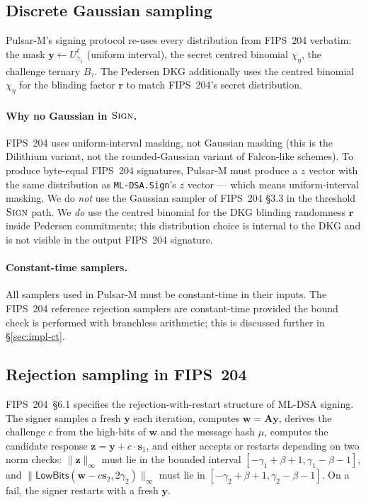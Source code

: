 \documentclass[11pt,a4paper]{article}
\theoremstyle{definition}
\theoremstyle{remark}
\newcommand{\LowBits}{\mathsf{LowBits}}
\newcommand{\Sign}{\textsc{Sign}}
\begin{document}
\subsection{Discrete Gaussian sampling}
\label{sec:prelim-gauss}

Pulsar-M's signing protocol re-uses every distribution from FIPS~204
verbatim: the mask $\mathbf{y} \gets U_{\gamma_1}^\ell$ (uniform interval),
the secret centred binomial $\chi_\eta$, the challenge ternary
$B_\tau$. The Pedersen DKG additionally uses the centred binomial
$\chi_\eta$ for the blinding factor $\mathbf{r}$ to match
FIPS~204's secret distribution.

\paragraph{Why no Gaussian in $\Sign$.}
FIPS~204 uses uniform-interval masking, not Gaussian masking (this is
the Dilithium variant, not the rounded-Gaussian variant of
Falcon-like schemes). To produce byte-equal FIPS~204 signatures,
Pulsar-M must produce a $z$ vector with the same distribution as
\texttt{ML-DSA.Sign}'s $z$ vector --- which means uniform-interval
masking. We do \emph{not} use the Gaussian sampler of FIPS~204 \S3.3
in the threshold $\Sign$ path. We \emph{do} use the centred binomial
for the DKG blinding randomness $\mathbf{r}$ inside Pedersen
commitments; this distribution choice is internal to the DKG and is
not visible in the output FIPS~204 signature.

\paragraph{Constant-time samplers.}
All samplers used in Pulsar-M must be constant-time in their inputs.
The FIPS~204 reference rejection samplers are constant-time provided
the bound check is performed with branchless arithmetic; this is
discussed further in \S\ref{sec:impl-ct}.

\subsection{Rejection sampling in FIPS~204}
\label{sec:prelim-rejection}

FIPS~204~\S6.1 specifies the rejection-with-restart structure of
ML-DSA signing. The signer samples a fresh $\mathbf{y}$ each
iteration, computes $\mathbf{w} = \mathbf{A}\mathbf{y}$, derives the
challenge $c$ from the high-bits of $\mathbf{w}$ and the message
hash $\mu$, computes the candidate response
$\mathbf{z} = \mathbf{y} + c \cdot \mathbf{s}_1$, and either accepts
or restarts depending on two norm checks: $\|\mathbf{z}\|_\infty$
must lie in the bounded interval
$[-\gamma_1 + \beta + 1, \gamma_1 - \beta - 1]$, and
$\|\LowBits(\mathbf{w} - c\mathbf{s}_2, 2\gamma_2)\|_\infty$ must lie
in $[-\gamma_2 + \beta + 1, \gamma_2 - \beta - 1]$. On a fail, the
signer restarts with a fresh $\mathbf{y}$.
\end{document}
